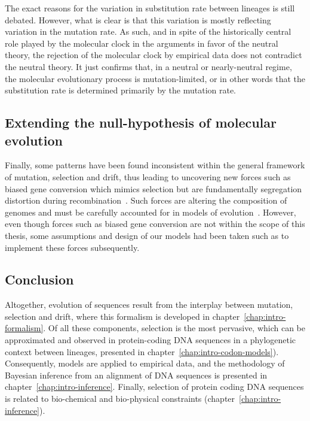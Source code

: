 The exact reasons for the variation in substitution rate between lineages is still debated.
However, what is clear is that this variation is mostly reflecting variation in the mutation rate.
As such, and in spite of the historically central role played by the molecular clock in the arguments in favor of the neutral theory, the rejection of the molecular clock by empirical data does not contradict the neutral theory.
It just confirms that, in a neutral or nearly-neutral regime, the molecular evolutionary process is mutation-limited, or in other words that the substitution rate is determined primarily by the mutation rate.

\subsection{Extending the null-hypothesis of molecular evolution}
\label{subsec:extending-the-null-hypothesis-of-molecular-evolution}

Finally, some patterns have been found inconsistent within the general framework of mutation, selection and drift, thus leading to uncovering new forces such as biased gene conversion which mimics selection but are fundamentally segregation distortion during recombination~\citep{Marais2003,Galtier2007,Duret2009}.
Such forces are altering the composition of genomes and must be carefully accounted for in models of evolution~\citep{Galtier2009,Ratnakumar2010, Figuet2014}.
However, even though forces such as biased gene conversion are not within the scope of this thesis, some assumptions and design of our models had been taken such as to implement these forces subsequently.

\subsection{Conclusion}
\label{subsec:conclusion}

Altogether, evolution of sequences result from the interplay between mutation, selection and drift, where this formalism is developed in chapter~\ref{chap:intro-formalism}.
Of all these components, selection is the most pervasive, which can be approximated and observed in protein-coding \acrshort{DNA} sequences in a phylogenetic context between lineages, presented in chapter~\ref{chap:intro-codon-models}).
Consequently, models are applied to empirical data, and the methodology of Bayesian inference from an alignment of DNA sequences is presented in chapter~\ref{chap:intro-inference}.
Finally, selection of protein coding DNA sequences is related to bio-chemical and bio-physical constraints (chapter~\ref{chap:intro-inference}).
